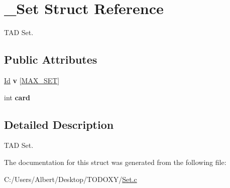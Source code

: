 \hypertarget{struct___set}{\section{\-\_\-\-Set Struct Reference}
\label{struct___set}
}


T\-A\-D Set.  


\subsection*{Public Attributes}
\begin{DoxyCompactItemize}
\item 
\hypertarget{struct___set_a3c72d1780e4b24269a6adcf59ed7fd65}{\hyperlink{_types_8h_a845e604fb28f7e3d97549da3448149d3}{Id} {\bfseries v} \mbox{[}\hyperlink{_set_8h_abc21882f4958e6b56aaf2f3c18f80d43}{M\-A\-X\-\_\-\-S\-E\-T}\mbox{]}}\label{struct___set_a3c72d1780e4b24269a6adcf59ed7fd65}

\item 
\hypertarget{struct___set_afc4f545ff1fc4ad05f52990484963c58}{int {\bfseries card}}\label{struct___set_afc4f545ff1fc4ad05f52990484963c58}

\end{DoxyCompactItemize}


\subsection{Detailed Description}
T\-A\-D Set. 


\begin{DoxyItemize}
\item 
\end{DoxyItemize}

The documentation for this struct was generated from the following file\-:\begin{DoxyCompactItemize}
\item 
C\-:/\-Users/\-Albert/\-Desktop/\-T\-O\-D\-O\-X\-Y/\hyperlink{_set_8c}{Set.\-c}\end{DoxyCompactItemize}
